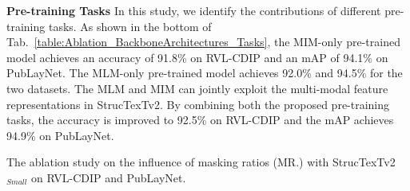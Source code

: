 \documentclass{article} %
\begin{document}
\noindent\textbf{Pre-training Tasks} In this study, we identify the contributions of different pre-training tasks. As shown in the bottom of Tab.~\ref{table:Ablation_BackboneArchitectures_Tasks}, the MIM-only pre-trained model achieves an accuracy of 91.8\% on RVL-CDIP and an mAP of 94.1\% on PubLayNet. The MLM-only pre-trained model achieves 92.0\% and 94.5\% for the two datasets. The MLM and MIM can jointly exploit the multi-modal feature representations in StrucTexTv2. By combining both the proposed pre-training tasks, the accuracy is improved to 92.5\% on RVL-CDIP and the mAP achieves 94.9\% on PubLayNet.

\begin{table}[ht]
\begin{minipage}[t]{0.35\linewidth}
\caption{The ablation study on the influence of masking ratios (MR.) with StrucTexTv2$_{Small}$ on RVL-CDIP and PubLayNet.}
\label{table:Ablation_MaskingRates}
\vspace{-1em}
\begin{center}
\end{center}
\end{minipage}
\hspace{0.02\linewidth}
\begin{minipage}[t]{0.62\linewidth}
\caption{Consumption analysis on RVL-CDIP. We re-implement $\rm LayoutLMv3^*_{Base}$ with open-source OCR engines to provide text. {$^\dag$} denotes the cost of OCR process. All the models are inferred on a NVIDIA Tesla 80G A100.}
\label{table:Ablation_Consumption}
\vspace{-1em}
\begin{center}
\end{center}
\end{minipage}
\end{table}
\end{document}
